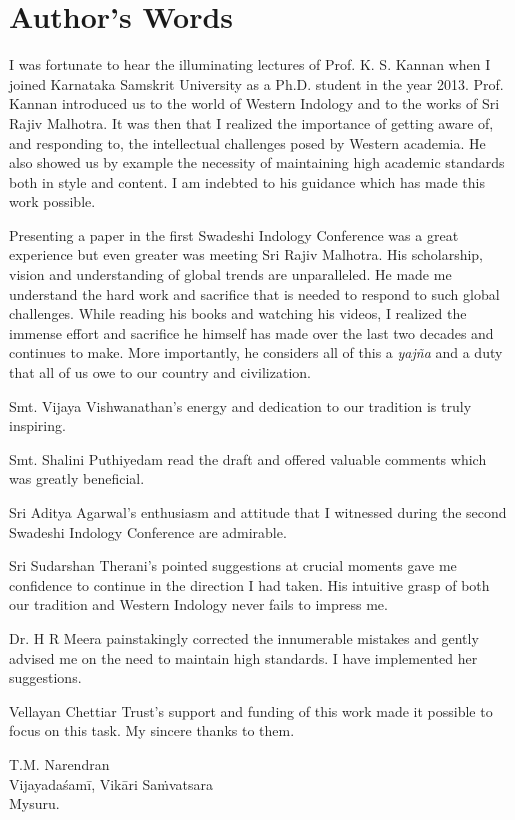 
\chapter*{Author’s Words}

I was fortunate to hear the illuminating lectures of Prof. K. S. Kannan when I joined Karnataka Samskrit University as a Ph.D. student in the year 2013. Prof. Kannan introduced us to the world of Western Indology and to the works of Sri Rajiv Malhotra. It was then that I realized the importance of getting aware of, and responding to, the intellectual challenges posed by Western academia. He also showed us by example the necessity of maintaining high academic standards both in style and content. I am indebted to his guidance which has made this work possible.

Presenting a paper in the first Swadeshi Indology Conference was a great experience but even greater was meeting Sri Rajiv Malhotra. His scholarship, vision and understanding of global trends are unparalleled. He made me understand the hard work and sacrifice that is needed to respond to such global challenges. While reading his books and watching his videos, I realized the immense effort and sacrifice he himself has made over the last two decades and continues to make. More importantly, he considers all of this a \textit{yajña} and a duty that all of us owe to our country and civilization.

Smt. Vijaya Vishwanathan’s energy and dedication to our tradition is truly inspiring.

Smt. Shalini Puthiyedam read the draft and offered valuable comments which was greatly beneficial.

Sri Aditya Agarwal’s enthusiasm and attitude that I witnessed during the second Swadeshi Indology Conference are admirable.

Sri Sudarshan Therani’s pointed suggestions at crucial moments gave me confidence to continue in the direction I had taken. His intuitive grasp of both our tradition and Western Indology never fails to impress me.

Dr. H R Meera painstakingly corrected the innumerable mistakes and gently advised me on the need to maintain high standards. I have implemented her suggestions.

Vellayan Chettiar Trust’s support and funding of this work made it possible to focus on this task. My sincere thanks to them.

\begin{flushright}
T.M. Narendran\\ Vijayadaśamī, Vikāri Saṁvatsara\\ Mysuru.
\end{flushright}

